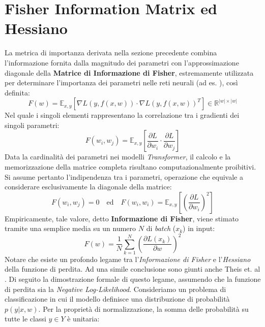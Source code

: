 \section{Fisher Information Matrix ed Hessiano}
La metrica di importanza derivata nella sezione precedente combina
l'informazione fornita dalla magnitudo dei parametri con l'approssimazione
diagonale della \textbf{Matrice di Informazione di Fisher}, estremamente
utilizzata per determinare l'importanza dei parametri nelle reti neurali (ad
es. \cite{molchanov2019importanceestimationneuralnetwork}
\cite{theis2018fastergazepredictiondense}), così definita:
\begin{equation}
    F(w) = \mathbb{E}_{x,y} \left[ \nabla L(y, f(x,w)) \cdot \nabla L(y, f(x,w))^T \right] \in \mathbb{R}^{|w| \times |w|}
\end{equation}
Nel quale i singoli elementi rappresentano la correlazione tra i gradienti dei singoli parametri:
\begin{equation}
    F(w_i, w_j) = \mathbb{E}_{x,y} \left[ \frac{\partial L}{\partial w_i} \cdot \frac{\partial L}{\partial w_j} \right]
\end{equation} \newline
Data la cardinalità dei parametri nei modelli \textit{Transformer}, il calcolo e la memorizzazione della matrice completa risultano computazionalmente proibitivi. Si assume pertanto l'indipendenza tra i parametri, operazione che equivale a considerare esclusivamente la diagonale della matrice:
$$ F(w_i, w_j) = 0 \quad \text{ed} \quad F(w_i, w_i) = \mathbb{E}_{x,y} \left[ \left(\frac{\partial L}{\partial w_i} \right)^2 \right] $$
Empiricamente, tale valore, detto \textbf{Informazione di Fisher}, viene stimato tramite una semplice media su un numero $N$ di \textit{batch} ($x_k$) in input:
\begin{equation}
    F(w) = \frac{1}{N} \sum_{k=1}^{N} \left( \frac{\partial L(x_k)}{\partial w} \right)^2
\end{equation} \newline
Notare che esiste un profondo legame tra l'\textit{Informazione di Fisher} e l'\textit{Hessiano} della funzione di perdita. Ad una simile conclusione sono giunti anche Theis et. al \cite{theis2018fastergazepredictiondense}. Di seguito la dimostrazione formale di questo legame, assumendo che la funzione di perdita sia la \textit{Negative Log-Likelihood}. \newline
Consideriamo un problema di classificazione in cui il modello definisce una distribuzione di probabilità $p(y|x,w)$. Per la proprietà di normalizzazione, la somma delle probabilità su tutte le classi $y \in Y$ è unitaria:
